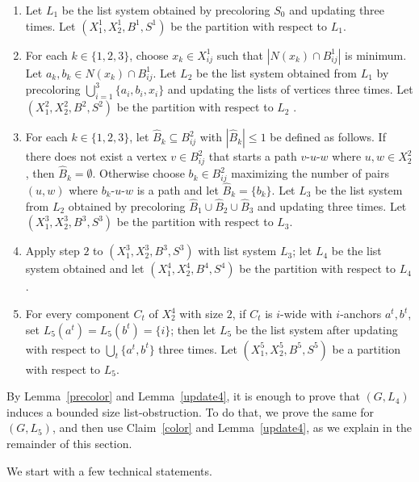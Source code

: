 \documentclass[11pt]{article}
\begin{document}
 \begin{enumerate}
 	\item  Let $L_1$ be the list system obtained by precoloring $S_0$ and updating three times. Let $(X^1_1, X^1_2, B^1, S^1)$ be the partition with respect to $L_1$. 
 	
	\item 	For each $k\in\{1,2,3\}$, choose $ x_k\in X^1_{ij} $ such that
	$ |N(x_k)  \cap  B^1_{ij}| $ is minimum. Let $ a_k,b_k\in N(x_k)  \cap  B^1_{ij} $. Let $L_2$ be the list system obtained from $L_1$ by precoloring $ \bigcup\limits_{i=1}^3 \{a_i,b_i,x_i\} $
	and updating  the lists of vertices three times. Let $(X^2_1, X^2_2, B^2, S^2)$ be the partition with respect to $L_2$ .
	

	\item For each $k\in\{1,2,3\}$, let $ \hat{B}_k \subseteq B^2_{ij} $ with $ |\hat{B}_k|\leq 1 $ be defined as follows. If there does not exist a vertex $v \in B^2_{ij}$ that starts a path  $ v$-$u$-$w $ where $ u, w \in X^2_2 $, then $ \hat{B}_k = \emptyset $. Otherwise choose $ b_k\in B^2_{ij}$ maximizing the number of pairs $ (u, w) $ where $b_k$-$u$-$w$ is a path and let $ \hat{B}_k = \{b_k\} $.
	 Let $L_3$ be the list system from $L_2$ obtained by precoloring $ \hat{B}_1\cup \hat{B}_2 \cup \hat{B}_3  $ and updating three times. Let $(X^3_1, X^3_2, B^3, S^3)$ be the partition with respect to $L_3$. 
	\item Apply step $2$ to $(X^3_1, X^3_2, B^3, S^3)$ with list system $L_3$; let $L_4$ be the list system obtained and let $(X^4_1, X^4_2, B^4, S^4)$ be the partition with respect to $L_4$. 
	\item For every component $C_t$ of $X^4_2$ with size $2$, if $C_t$ is $ i $-wide with $i$-anchors $a^t,b^t$, set $L_5(a^t)=L_5(b^t)=\{i\}$; then let $L_5$ be the list system after updating with respect to $\bigcup_t\{a^t,b^t\}$ three times. Let $(X^5_1, X^5_2, B^5, S^5)$ be a partition with respect to $L_5$. 
	\end{enumerate} 


By Lemma~\ref{precolor} and Lemma~\ref{update4}, it is enough to prove that $ (G,L_4) $ induces a bounded size list-obstruction. To do that, we 
prove the same for $ (G,L_5) $, and then  use Claim~\ref{color} and Lemma~\ref{update4}, as we explain in the remainder of this section.

We start with  a few technical statements. 
\end{document}
